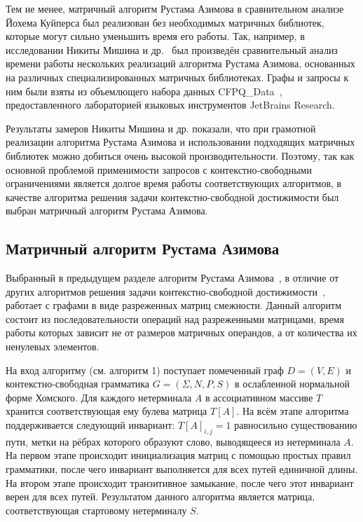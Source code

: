 Тем не менее, матричный алгоритм Рустама Азимова в сравнительном анализе Йохема Куйперса был реализован без необходимых матричных библиотек, которые могут сильно уменьшить время его работы. Так, например, в исследовании Никиты Мишина и др.~\cite{azimov-evalution} был произведён сравнительный анализ времени работы нескольких реализаций алгоритма Рустама Азимова, основанных на различных специализированных матричных библиотеках. Графы и запросы к ним были взяты из объемлющего набора данных CFPQ\_Data~\cite{cfpq-data}, предоставленного лабораторией языковых инструментов JetBrains Research. 

Результаты замеров Никиты Мишина и др. показали, что при грамотной реализации алгоритма Рустама Азимова и использовании подходящих матричных библиотек можно добиться очень высокой производительности. Поэтому, так как основной проблемой применимости запросов с контекстно-свободными ограничениями является долгое время работы соответствующих алгоритмов, в качестве алгоритма решения задачи конте\-кстно-свободной достижимости был выбран матричный алгоритм Рустама Азимова.

\subsection{Матричный алгоритм Рустама Азимова}\label{sec:matrix-algo}
Выбранный в предыдущем разделе алгоритм Рустама Азимова~\cite{Azimov:2018:CPQ:3210259.3210264}, в отличие от других алгоритмов решения задачи контекстно-свободной достижимости~\cite{hellings-2015, santos-2018, zhlang-2016}, работает с графами в виде разреженных матриц смежности. Данный алгоритм состоит из последовательности операций над разреженными матрицами, время работы которых зависит не от размеров матричных операндов, а от количества их ненулевых элементов.

На вход алгоритму (см. алгоритм 1) поступает помеченный граф $D=(V,E)$ и контекстно-свободная грамматика $G=(\Sigma, N, P, S)$ в ослабленной нормальной форме Хомского. Для каждого нетерминала $A$ в ассоциативном массиве $T$ хранится соответствующая ему булева матрица $T[A]$. На всём этапе алгоритма поддерживается следующий инвариант: $T[A]_{i,j} = 1$ равносильно существованию пути, метки на рёбрах которого образуют слово, выводящееся из нетерминала $A$. На первом этапе происходит инициализация матриц с помощью простых правил грамматики, после чего инвариант выполняется для всех путей единичной длины. На втором этапе происходит транзитивное замыкание, после чего этот инвариант верен для всех путей. Результатом данного алгоритма является матрица, соответствующая стартовому нетерминалу $S$.

